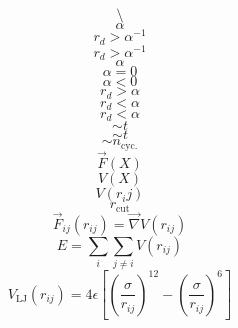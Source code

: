 \documentclass{scrreprt}
\begin{document}
\begin{equation}
\setminus
\end{equation}
\begin{equation}
\alpha
\end{equation}
\begin{equation}
r_d > \alpha^{-1}
\end{equation}
\begin{equation}
r_d > \alpha^{-1}
\end{equation}
\begin{equation}
\alpha
\end{equation}
\begin{equation}
\alpha=0
\end{equation}
\begin{equation}
\alpha<0
\end{equation}
\begin{equation}
r_d > \alpha
\end{equation}
\begin{equation}
r_d < \alpha
\end{equation}
\begin{equation}
r_d < \alpha
\end{equation}
\begin{equation}
\sim t
\end{equation}
\begin{equation}
\sim t
\end{equation}
\begin{equation}
\sim n_\text{cyc.}
\end{equation}
\begin{equation}
\vec F(X)
\end{equation}
\begin{equation}
V(X)
\end{equation}
\begin{equation}
V(r_ij)
\end{equation}
\begin{equation}
r_\text{cut}
\end{equation}
\begin{equation}
  \label{eq:pairforce}
  \vec F_{ij}(r_{ij}) = \vec\nabla V(r_{ij})
\end{equation}
\begin{equation}
  \label{eq:pairenergy}
  E = \sum_i\sum_{j \neq i}{V(r_{ij})}
\end{equation}
\begin{equation}
  \label{eq:lennardjones}
  V_\text{LJ}(r_{ij}) = 4 \epsilon \left[\left(\frac{\sigma}{r_{ij}}\right)^{12} - \left(\frac{\sigma}{r_{ij}}\right)^{6}\right]
\end{equation}
\end{document}
